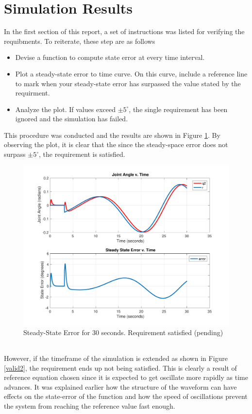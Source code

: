 \documentclass[12pt]{article}
\begin{document}
\section{Simulation Results}
In the first section of this report, a set of instructions was listed for verifying the requibments. To reiterate, these step are as follows
\begin{itemize}
	\item Devise a function to compute state error at every time interval.
	\item Plot a steady-state error to time curve. On this curve, include a reference line to mark when your steady-state error has surpassed the value stated by the requirment.
	\item Analyze the plot. If values exceed  $\pm5^{\circ}$, the single requirement has been ignored and the simulation has failed.
\end{itemize}
This procedure was conducted and the results are shown in Figure \ref{valid1}. By observing the plot, it is clear that the since the steady-space error does not surpass $\pm5^{\circ}$, the requirement is satisfied. 
\\
\begin{figure}[h!]
\centering
\includegraphics[width=1\textwidth]{StateErrorNormal.pdf}
\caption{Steady-State Error for 30 seconds. Requirement satisfied (pending)}
\label{valid1}
\end{figure}
\\ 
However, if the timeframe of the simulation is extended as shown in Figure \ref{valid2}, the requirement ends up not being satisfied. This is clearly a result of reference equation chosen since it is expected to get oscillate more rapidly as time advances. It was explained earlier how the structure of the waveform can have effects on the state-error of the function and how the speed of oscillations prevent the system from reaching the reference value fast enough.
\end{document}
